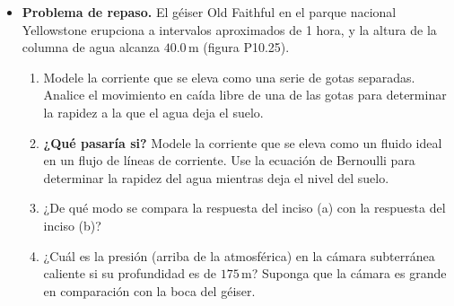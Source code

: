 \documentclass[11pt,a4paper]{article}
\begin{document}
\begin{itemize}
    \item[\textbf{25.}] \textbf{Problema de repaso.} El géiser Old Faithful en el parque nacional Yellowstone erupciona a intervalos aproximados de 1 hora, y la altura de la columna de agua alcanza \(40.0\,\text{m}\) (figura P10.25).
    \begin{enumerate}
        \item Modele la corriente que se eleva como una serie de gotas separadas. Analice el movimiento en caída libre de una de las gotas para determinar la rapidez a la que el agua deja el suelo.
        \item \textbf{¿Qué pasaría si?} Modele la corriente que se eleva como un fluido ideal en un flujo de líneas de corriente. Use la ecuación de Bernoulli para determinar la rapidez del agua mientras deja el nivel del suelo.
        \item ¿De qué modo se compara la respuesta del inciso (a) con la respuesta del inciso (b)?
        \item ¿Cuál es la presión (arriba de la atmosférica) en la cámara subterránea caliente si su profundidad es de \(175\,\text{m}\)? Suponga que la cámara es grande en comparación con la boca del géiser.
    \end{enumerate}
    
    \vspace*{8cm}
\end{itemize}

\newpage
\end{document}
